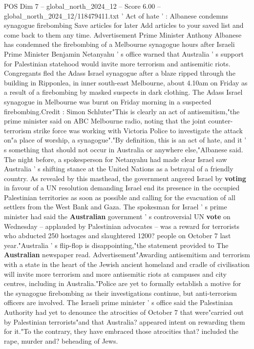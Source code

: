 \begin{textsample}{POS Dim 7 – global\_north\_2024\_12 – Score 6.00 – global\_north\_2024\_12/118479411.txt}  \label{ex:f7_pos_292}
' Act of hate ' : Albanese condemns synagogue firebombing Save articles for later Add articles to your saved list and come back to them any time.
Advertisement Prime Minister Anthony Albanese has condemned the firebombing of a Melbourne synagogue hours after Israeli Prime Minister Benjamin Netanyahu ' s office warned that Australia ' s support for Palestinian statehood would invite more terrorism and antisemitic riots.
Congregants fled the Adass Israel synagogue after a blaze ripped through the building in Ripponlea, in inner south-east Melbourne, about 4.10am on Friday as a result of a firebombing by masked suspects in dark clothing.
The Adass Israel synagogue in Melbourne was burnt on Friday morning in a suspected firebombing.Credit : Simon Schluter"This is clearly an act of antisemitism,"the prime minister said on ABC Melbourne radio, noting that the joint counter-terrorism strike force was working with Victoria Police to investigate the attack on"a place of worship, a synagogue"."By definition, this is an act of hate, and it ' s something that should not occur in Australia or anywhere else,"Albanese said.
The night before, a spokesperson for Netanyahu had made clear Israel saw Australia ' s shifting stance at the United Nations as a betrayal of a friendly country.
As revealed by this masthead, the government angered Israel by \textbf{voting} in favour of a UN resolution demanding Israel end its presence in the occupied Palestinian territories as soon as possible and calling for the evacuation of all settlers from the West Bank and Gaza.
The spokesman for Israel ' s prime minister had said the \textbf{Australian} government ' s controversial UN \textbf{vote} on Wednesday -- applauded by Palestinian advocates -- was a reward for terrorists who abducted 250 hostages and slaughtered 1200? people on October 7 last year."Australia ' s flip-flop is disappointing,"the statement provided to The \textbf{Australian} newspaper read.
Advertisement"Awarding antisemitism and terrorism with a state in the heart of the Jewish ancient homeland and cradle of civilisation will invite more terrorism and more antisemitic riots at campuses and city centres, including in Australia."Police are yet to formally establish a motive for the synagogue firebombing as their investigations continue, but anti-terrorism officers are involved.
The Israeli prime minister ' s office said the Palestinian Authority had yet to denounce the atrocities of October 7 that were"carried out by Palestinian terrorists"and that Australia? appeared intent on rewarding them for it."To the contrary, they have embraced those atrocities that? included the rape, murder and? beheading of Jews.

\end{textsample}
